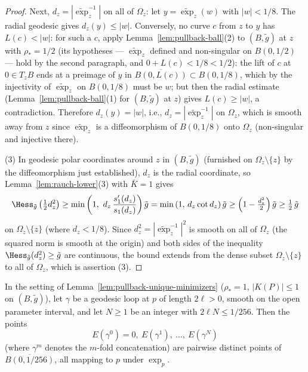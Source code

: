 \begin{proof}
Next, $d_z=|\widetilde\exp_z^{-1}|$ on all of $\Omega_z$: let
$y=\widetilde\exp_z(w)$ with $|w|<1/8$. The radial geodesic gives
$d_z(y)\le|w|$. Conversely, no curve $c$ from $z$ to $y$ has
$L(c)<|w|$: for such a $c$, apply
Lemma~\ref{lem:pullback-ball}(2) to $(B,\tilde g)$ at $z$ with
$\rho_*=1/2$ (its hypotheses --- $\widetilde\exp_z$ defined and
non-singular on $B(0,1/2)$ --- hold by the second paragraph, and
$0+L(c)<1/8<1/2$): the lift of $c$ at $0\in T_zB$ ends at a
preimage of $y$ in $\overline{B(0,L(c))}\subset B(0,1/8)$, which
by the injectivity of $\widetilde\exp_z$ on $B(0,1/8)$ must be
$w$; but then the radial estimate
(Lemma~\ref{lem:pullback-ball}(1) for $(B,\tilde g)$ at $z$)
gives $L(c)\ge|w|$, a contradiction. Therefore $d_z(y)=|w|$,
i.e., $d_z=|\widetilde\exp_z^{-1}|$ on $\Omega_z$, which is
smooth away from $z$ since $\widetilde\exp_z$ is a diffeomorphism
of $B(0,1/8)$ onto $\Omega_z$ (non-singular and injective there).

(3) In geodesic polar coordinates around $z$ in $(B,\tilde g)$
(furnished on $\Omega_z\setminus\{z\}$ by the diffeomorphism just
established), $d_z$ is the radial coordinate, so
Lemma~\ref{lem:rauch-lower}(3) with $\bar K=1$ gives
$$\Hess_{\tilde g}\left(\tfrac12d_z^2\right)
\ge\min\left(1,\ d_z\,\frac{s_1'(d_z)}{s_1(d_z)}\right)\tilde g
=\min\left(1,\,d_z\cot d_z\right)\tilde g
\ge\left(1-\tfrac{d_z^2}{2}\right)\tilde g\ge\tfrac12\,\tilde g$$
on $\Omega_z\setminus\{z\}$ (where $d_z<1/8$). Since
$d_z^2=|\widetilde\exp_z^{-1}|^2$ is smooth on all of $\Omega_z$
(the squared norm is smooth at the origin) and both sides of the
inequality $\Hess_{\tilde g}(d_z^2)\ge\tilde g$ are continuous,
the bound extends from the dense subset
$\Omega_z\setminus\{z\}$ to all of $\Omega_z$, which is assertion
(3).
\end{proof}

\begin{lemma}
\label{lem:loop-multiples-distinct}
In the setting of Lemma~\ref{lem:pullback-unique-minimizers}
($\rho_*=1$, $|K(P)|\le1$ on $(B,\tilde g)$), let $\gamma$ be a
geodesic loop at $p$ of length $2\ell>0$, smooth on the open
parameter interval, and let $N\ge1$ be an integer with
$2\ell N\le1/256$. Then the points
$$E(\gamma^0)=0,\ E(\gamma^1),\ \ldots,\ E(\gamma^N)$$
(where $\gamma^m$ denotes the $m$-fold concatenation) are pairwise
distinct points of $\overline{B(0,1/256)}$, all mapping to $p$
under $\exp_p$.
\end{lemma}

